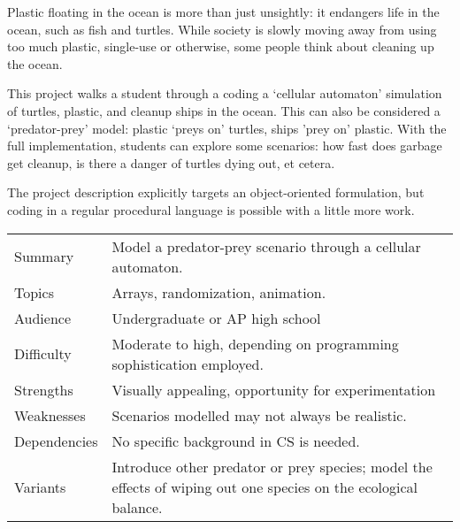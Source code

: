 
Plastic floating in the ocean is more than just unsightly:
it endangers life in the ocean, such as fish and turtles.
While society is slowly moving away from using too much
plastic, single-use or otherwise,
some people think about cleaning up the ocean.

This project walks a student through a
coding a `cellular automaton' simulation
of turtles, plastic, and cleanup ships in the ocean.
This can also be considered a `predator-prey' model:
plastic `preys on' turtles, ships 'prey on' plastic.
With the full implementation, students can explore some scenarios:
how fast does garbage get cleanup, is there a danger of turtles dying out,
et cetera.

The project description explicitly targets an object-oriented formulation,
but coding in a regular procedural language is possible with
a little more work.

\newpage

\begin{tabular}{|l|p{5in}|}
  \hline
  Summary&Model a predator-prey scenario through a cellular automaton.
  \\
  Topics&Arrays, randomization, animation.
  \\
  Audience&Undergraduate or AP high school
  \\
  Difficulty&Moderate to high, depending on programming sophistication employed.
  \\
  Strengths&Visually appealing, opportunity for experimentation
  \\
  Weaknesses&Scenarios modelled may not always be realistic.
  \\
  Dependencies&No specific background in CS is needed.
  \\
  Variants&Introduce other predator or prey species; model the effects of wiping
  out one species on the ecological balance.
  \\
  \hline
\end{tabular}
